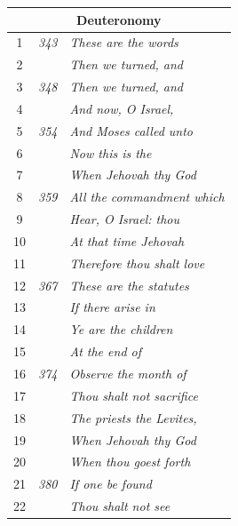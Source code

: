 \documentclass{article}
\newlength{\minipageheight}
\newlength{\minipagewidth}
\begin{document}
\begin{minipage}[r][\minipageheight][t]{\minipagewidth}
\begin{longtable}{ccl}
        \multicolumn{3}{c}{\textbf{Deuteronomy}}                        \\
        \hline
        1           & \textit{343} & \textit{These are the words}       \\
        2           &              & \textit{Then we turned, and}       \\
        3           & \textit{348} & \textit{Then we turned, and}       \\
        4           &              & \textit{And now, O Israel,}        \\
        5           & \textit{354} & \textit{And Moses called unto}     \\
        6           &              & \textit{Now this is the}           \\
        7           &              & \textit{When Jehovah thy God}      \\
        8           & \textit{359} & \textit{All the commandment which} \\
        9           &              & \textit{Hear, O Israel: thou}      \\
        10          &              & \textit{At that time Jehovah}      \\
        11          &              & \textit{Therefore thou shalt love} \\
        12          & \textit{367} & \textit{These are the statutes}    \\
        13          &              & \textit{If there arise in}         \\
        14          &              & \textit{Ye are the children}       \\
        15          &              & \textit{At the end of}             \\
        16          & \textit{374} & \textit{Observe the month of}      \\
        17          &              & \textit{Thou shalt not sacrifice}  \\
        18          &              & \textit{The priests the Levites,}  \\
        19          &              & \textit{When Jehovah thy God}      \\
        20          &              & \textit{When thou goest forth}     \\
        21          & \textit{380} & \textit{If one be found}           \\
        22          &              & \textit{Thou shalt not see}        \\

\end{longtable}
\end{minipage}
\end{document}

